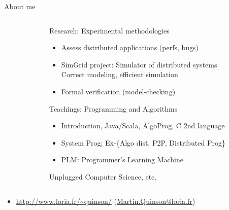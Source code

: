 \begin{frame}{About me}
\begin{columns}
\begin{column}{.27\linewidth}
    \end{column}
    \begin{column}{.72\linewidth}
      \begin{block}{Research: {\color{black}Experimental methodologies}}
        \begin{itemize} 
        \item Assess distributed applications {\small(perfs, bugs)}
        \item SimGrid project: Simulator of distributed systems\\
          Correct modeling, efficient simulation
        \item Formal verification (model-checking)
        \end{itemize}
      \end{block}\vspace{-.5\baselineskip}

      \begin{block}{Teachings: {\color{black}Programming and Algorithms}}
        \begin{itemize}
        \item Introduction, Java/Scala, AlgoProg, C 2nd language
        \item System Prog; Ex-\{Algo dist, P2P, Distributed Prog\}
        \item PLM: Programmer's Learning Machine
        \end{itemize}
      \end{block}

       Unplugged Computer Science, etc.
    \end{column}
  \end{columns}
  \bigskip
  \begin{itemize}
    \item {}
      {\small\url{http://www.loria.fr/~quinson/} (\url{Martin.Quinson@loria.fr})}
    \end{itemize}
\end{frame}
